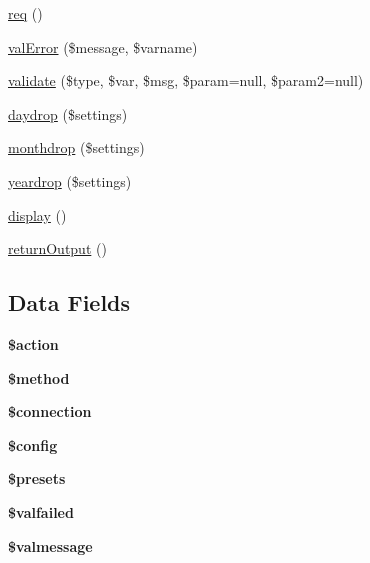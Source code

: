 \begin{DoxyCompactItemize}
\item 
\hyperlink{classg_form_ae76ba59e3c727ee4ac7f3c403ce9289e}{req} ()
\item 
\hyperlink{classg_form_a2972b64145d1c98601aa67261b805879}{val\-Error} (\$message, \$varname)
\item 
\hyperlink{classg_form_aa78e310c19c791e6698ced6cd851811d}{validate} (\$type, \$var, \$msg, \$param=null, \$param2=null)
\item 
\hyperlink{classg_form_ae13bc3b1129cbbdbcad4376e3c3ce90d}{daydrop} (\$settings)
\item 
\hyperlink{classg_form_a0c824ae51fcdd0f9dde83b896bd5f186}{monthdrop} (\$settings)
\item 
\hyperlink{classg_form_a290f1906797ca46806944f8d2c94e372}{yeardrop} (\$settings)
\item 
\hyperlink{classg_form_a0b9b6e6acd4a839fc7c2f26f96b5cfa8}{display} ()
\item 
\hyperlink{classg_form_ae683a3a58a87474c9def057f182048d5}{return\-Output} ()
\end{DoxyCompactItemize}
\subsection*{Data Fields}
\begin{DoxyCompactItemize}
\item 
\hypertarget{classg_form_aa698a3e72116e8e778be0e95d908ee30}{{\bfseries \$action}}\label{classg_form_aa698a3e72116e8e778be0e95d908ee30}

\item 
\hypertarget{classg_form_a12661b2fc0f57f97e30a1620889ce9c6}{{\bfseries \$method}}\label{classg_form_a12661b2fc0f57f97e30a1620889ce9c6}

\item 
\hypertarget{classg_form_a0d9c79b9b86b3f5891c6d3892f12c6a0}{{\bfseries \$connection}}\label{classg_form_a0d9c79b9b86b3f5891c6d3892f12c6a0}

\item 
\hypertarget{classg_form_a49c7011be9c979d9174c52a8b83e5d8e}{{\bfseries \$config}}\label{classg_form_a49c7011be9c979d9174c52a8b83e5d8e}

\item 
\hypertarget{classg_form_ab1e2044844933970d1f1463832c0a689}{{\bfseries \$presets}}\label{classg_form_ab1e2044844933970d1f1463832c0a689}

\item 
\hypertarget{classg_form_ae23174ae7472be28c3b4d1e11864da99}{{\bfseries \$valfailed}}\label{classg_form_ae23174ae7472be28c3b4d1e11864da99}

\item 
\hypertarget{classg_form_af7fa52ab3124672ea860fed81a169938}{{\bfseries \$valmessage}}\label{classg_form_af7fa52ab3124672ea860fed81a169938}

\end{DoxyCompactItemize}

